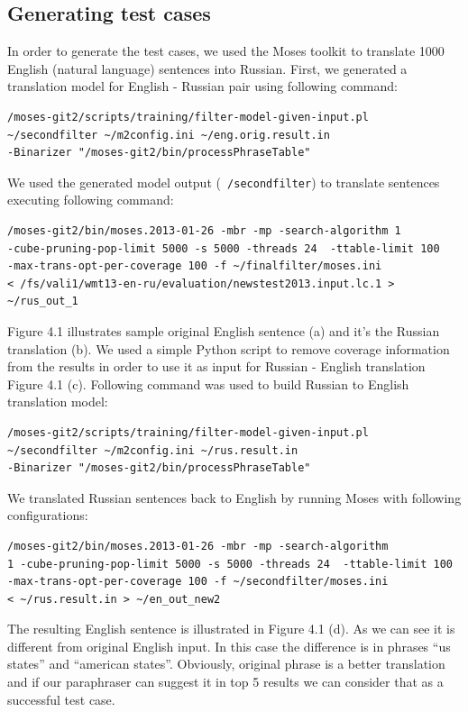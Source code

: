 \subsection{Generating test cases}

In order to generate the test cases, we used the Moses toolkit to translate 1000 English (natural language) sentences into Russian. First, we generated a translation model for English - Russian pair using following command:

\begin{verbatim}
/moses-git2/scripts/training/filter-model-given-input.pl 
~/secondfilter ~/m2config.ini ~/eng.orig.result.in 
-Binarizer "/moses-git2/bin/processPhraseTable"
\end{verbatim} 

We used the generated model output (\texttt{~/secondfilter}) to translate sentences executing following command:

\begin{verbatim}
/moses-git2/bin/moses.2013-01-26 -mbr -mp -search-algorithm 1 
-cube-pruning-pop-limit 5000 -s 5000 -threads 24  -ttable-limit 100
-max-trans-opt-per-coverage 100 -f ~/finalfilter/moses.ini 
< /fs/vali1/wmt13-en-ru/evaluation/newstest2013.input.lc.1 > ~/rus_out_1
\end{verbatim} 

Figure 4.1 illustrates sample original English sentence (a) and it's the Russian translation (b). We used a simple Python script to remove coverage information from the results in order to use it as input for Russian - English translation Figure 4.1 (c). Following command was used to build Russian to English translation model:

\begin{verbatim}
/moses-git2/scripts/training/filter-model-given-input.pl 
~/secondfilter ~/m2config.ini ~/rus.result.in 
-Binarizer "/moses-git2/bin/processPhraseTable"
\end{verbatim} 

We translated Russian sentences back to English by running Moses with following configurations:

\begin{verbatim}
/moses-git2/bin/moses.2013-01-26 -mbr -mp -search-algorithm 
1 -cube-pruning-pop-limit 5000 -s 5000 -threads 24  -ttable-limit 100
-max-trans-opt-per-coverage 100 -f ~/secondfilter/moses.ini 
< ~/rus.result.in > ~/en_out_new2
\end{verbatim} 

The resulting English sentence is illustrated in Figure 4.1 (d). As we can see it is different from original English input. In this case the difference is in phrases ``us states'' and ``american states''. Obviously, original phrase is a better translation and if our paraphraser can suggest it in top 5 results we can consider that as a successful test case. 

